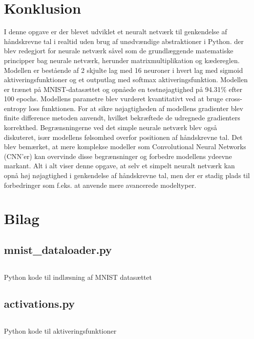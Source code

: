 \documentclass{article}
\newenvironment{code}{\captionsetup{type=listing}}{}
\begin{document}
\section{Konklusion}
I denne opgave er der blevet udviklet et neuralt netværk til genkendelse af håndskrevne tal i realtid uden brug af unødvændige abstraktioner i Python. der blev redegjort for neurale netværk såvel som de grundlæggende matematiske principper bag neurale netværk, herunder matrixmultiplikation og kædereglen. Modellen er bestående af 2 skjulte lag med 16 neuroner i hvert lag med sigmoid aktiveringsfunktioner og et outputlag med softmax aktiveringsfunktion. Modellen er trænet på MNIST-datasættet og opnåede en testnøjagtighed på 94.31\% efter 100 epochs. Modellens parametre blev vurderet kvantitativt ved at bruge cross-entropy loss funktionen. For at sikre nøjagtigheden af modellens gradienter blev finite difference metoden anvendt, hvilket bekræftede de udregnede gradienters korrekthed. Begrænsningerne ved det simple neurale netværk blev også diskuteret, især modellens følsomhed overfor positionen af håndskrevne tal. Det blev bemærket, at mere komplekse modeller som Convolutional Neural Networks (CNN'er) kan overvinde disse begrænsninger og forbedre modellens ydeevne markant. Alt i alt viser denne opgave, at selv et simpelt neuralt netværk kan opnå høj nøjagtighed i genkendelse af håndskrevne tal, men der er stadig plads til forbedringer som f.eks. at anvende mere avancerede modeltyper.
\newpage
{}
\printbibliography

\newpage
{}
\section*{Bilag}
\subsection*{mnist\_dataloader.py}
\begin{code}
  \inputminted{python}{mnist_dataloader.py}
  \caption{Python kode til indlæsning af MNIST datasættet}
  \label{lst:mnist_dataloader}
\end{code}
\newpage

\subsection*{activations.py}
\begin{code}
  \inputminted{python}{activations.py}
  \caption{Python kode til aktiveringsfunktioner}
  \label{lst:activations}
\end{code}
\newpage
\end{document}
